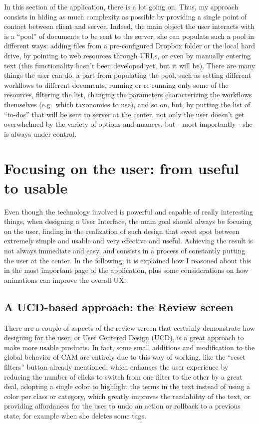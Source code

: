 \documentclass[12pt,oneside,svgnames]{memoir}
\begin{document}
In this section of the application, there is a lot going on. Thus, my
approach consists in hiding as much complexity as possible by providing
a single point of contact between client and server. Indeed, the main
object the user interacts with is a ``pool'' of documents to be sent to
the server; she can populate such a pool in different ways: adding files
from a pre-configured Dropbox folder or the local hard drive, by
pointing to web resources through URLs, or even by manually entering
text (this functionality hasn't been developed yet, but it will be).
There are many things the user can do, a part from populating the pool,
such as setting different workflows to different documents, running or
re-running only some of the resources, filtering the list, changing the
parameters characterizing the workflows themselves (e.g.~which
taxonomies to use), and so on, but, by putting the list of ``to-dos''
that will be sent to server at the center, not only the user doesn't get
overwhelmed by the variety of options and nuances, but - most
importantly - she is always under control.

\chapter{Focusing on the user: from useful to
usable}\label{focusing-on-the-user-from-useful-to-usable}

Even though the technology involved is powerful and capable of really
interesting things, when designing a User Interface, the main goal
should always be focusing on the user, finding in the realization of
such design that sweet spot between extremely simple and usable and very
effective and useful. Achieving the result is not always immediate and
easy, and consists in a process of constantly putting the user at the
center. In the following, it is explained how I reasoned about this in
the most important page of the application, plus some considerations on
how animations can improve the overall UX.

\section{A UCD-based approach: the Review
screen}\label{a-ucd-based-approach-the-review-screen}

There are a couple of aspects of the review screen that certainly
demonstrate how designing for the user, or User Centered Design (UCD),
is a great approach to make more usable products. In fact, some small
additions and modification to the global behavior of CAM are entirely
due to this way of working, like the ``reset filters'' button already
mentioned, which enhances the user experience by reducing the number of
clicks to switch from one filter to the other by a great deal, adopting
a single color to highlight the terms in the text instead of using a
color per class or category, which greatly improves the readability of
the text, or providing affordances for the user to undo an action or
rollback to a previous state, for example when she deletes some tags.
\end{document}
